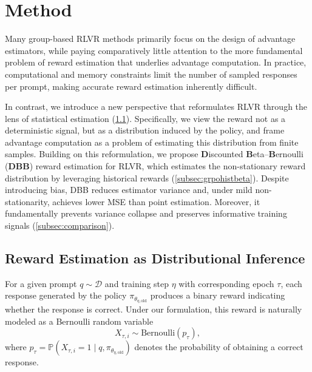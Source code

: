\section{Method}

Many group-based RLVR methods \cite{shao2024deepseekmath, liu2025understandingr1zeroliketrainingcritical, xie2025unlocking, le2025promptleftbehindexploiting} primarily focus on the design of advantage estimators, while paying comparatively little attention to the more fundamental problem of reward estimation that underlies advantage computation. In practice, computational and memory constraints limit the number of sampled responses per prompt, making accurate reward estimation inherently difficult.

In contrast, we introduce a new perspective that reformulates RLVR through the lens of statistical estimation (\cref{subsec:problem_formulation}). Specifically, we view the reward not as a deterministic signal, but as a distribution induced by the policy, and frame advantage computation as a problem of estimating this distribution from finite samples. Building on this reformulation, we propose \textbf{D}iscounted \textbf{B}eta--\textbf{B}ernoulli (\textbf{DBB}) reward estimation for RLVR, which estimates the non-stationary reward distribution by leveraging historical rewards (\cref{subsec:grpohistbeta}). Despite introducing bias, DBB reduces estimator variance and, under mild non-stationarity, achieves lower MSE than point estimation. Moreover, it fundamentally prevents variance collapse and preserves informative training signals (\cref{subsec:comparison}).


\subsection{Reward Estimation as Distributional Inference}
\label{subsec:problem_formulation}

For a given prompt $q \sim \mathcal{D}$ and training step $\eta$ with corresponding epoch $\tau$, each response generated by the policy $\pi_{\theta_{\eta,\mathrm{old}}}$ produces a binary reward indicating whether the response is correct. Under our formulation, this reward is naturally modeled as a Bernoulli random variable 
\begin{equation}
X_{\tau,i} \sim \mathrm{Bernoulli}\!\left(p_\tau\right),
\label{eq:bern}
\end{equation}
where 
$p_\tau = \mathbb{P}\!\left(X_{\tau,i}=1 \mid q, \pi_{\theta_{\eta,\mathrm{old}}}\right)$
denotes the probability of obtaining a correct response.

